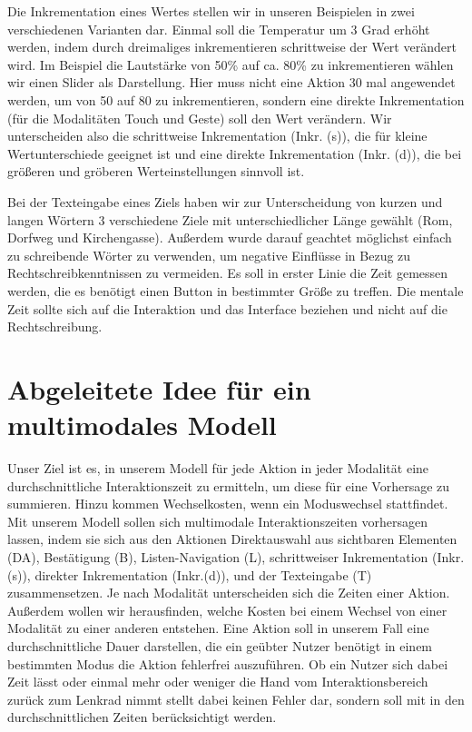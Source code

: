 Die Inkrementation eines Wertes stellen wir in unseren Beispielen in zwei verschiedenen Varianten dar. 
Einmal soll die Temperatur um 3 Grad erhöht werden, indem durch dreimaliges inkrementieren schrittweise der Wert verändert wird. 
Im Beispiel die Lautstärke von 50\% auf ca. 80\% zu inkrementieren wählen wir einen Slider als Darstellung. 
Hier muss nicht eine Aktion 30 mal angewendet werden, um von 50 auf 80 zu inkrementieren, sondern eine direkte Inkrementation (für die Modalitäten Touch und Geste) soll den Wert verändern. 
Wir unterscheiden also die schrittweise Inkrementation (Inkr. (s)), die für kleine Wertunterschiede geeignet ist und eine direkte Inkrementation (Inkr. (d)), die bei größeren und gröberen Werteinstellungen sinnvoll ist.

Bei der Texteingabe eines Ziels haben wir zur Unterscheidung von kurzen und langen Wörtern 3 verschiedene Ziele mit unterschiedlicher Länge gewählt (Rom, Dorfweg und Kirchengasse). 
Außerdem wurde darauf geachtet möglichst einfach zu schreibende Wörter zu verwenden, um negative Einflüsse in Bezug zu Rechtschreibkenntnissen zu vermeiden. 
Es soll in erster Linie die Zeit gemessen werden, die es benötigt einen Button in bestimmter Größe zu treffen. 
Die mentale Zeit sollte sich auf die Interaktion und das Interface beziehen und nicht auf die Rechtschreibung. 
\section[Idee des Modells]{Abgeleitete Idee für ein multimodales Modell}
Unser Ziel ist es, in unserem Modell für jede Aktion in jeder Modalität eine durchschnittliche Interaktionszeit zu ermitteln, um diese für eine Vorhersage zu summieren. Hinzu kommen Wechselkosten, wenn ein Moduswechsel stattfindet. Mit unserem Modell sollen sich multimodale Interaktionszeiten vorhersagen lassen, indem sie sich aus den Aktionen Direktauswahl aus sichtbaren Elementen (DA), Bestätigung (B), Listen-Navigation (L), schrittweiser Inkrementation (Inkr.(s)), direkter Inkrementation (Inkr.(d)), und der Texteingabe (T) zusammensetzen. 
Je nach Modalität unterscheiden sich die Zeiten einer Aktion. 
Außerdem wollen wir herausfinden, welche Kosten bei einem Wechsel von einer Modalität zu einer anderen entstehen. 
Eine Aktion soll in unserem Fall eine durchschnittliche Dauer darstellen, die ein geübter Nutzer benötigt in einem bestimmten Modus die Aktion fehlerfrei auszuführen. 
Ob ein Nutzer sich dabei Zeit lässt oder einmal mehr oder weniger die Hand vom Interaktionsbereich zurück zum Lenkrad nimmt stellt dabei keinen Fehler dar, sondern soll mit in den durchschnittlichen Zeiten berücksichtigt werden. 

